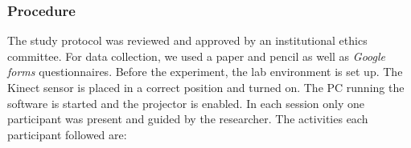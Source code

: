 \subsubsection{Procedure}
The study protocol was reviewed and approved by an institutional ethics committee. For data collection, we used a  paper and pencil as well as \textit{Google forms} questionnaires.
Before the experiment, the lab environment is set up. The Kinect sensor is placed in a correct position and turned on. The PC running the software is started and the projector is enabled. In each session only one participant was present and guided by the researcher. The activities each participant followed are:
